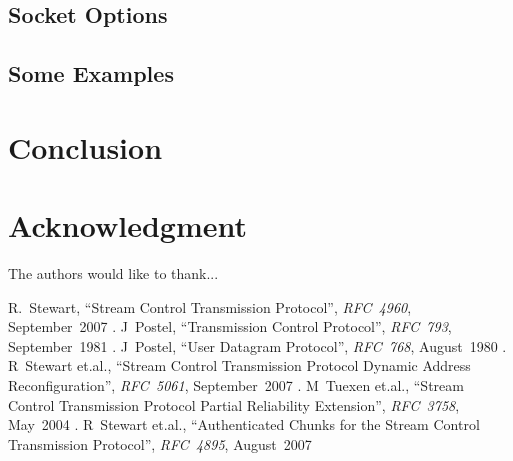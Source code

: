 \documentclass[conference]{IEEEtran}
\begin{document}
\subsection{Socket Options}

\subsection{Some Examples}


\section{Conclusion}

\section*{Acknowledgment}


The authors would like to thank...


\begin{thebibliography}{11}
 R.~Stewart,
  ``Stream Control Transmission Protocol'',
  \textit{RFC~4960},
  September~2007
.  J~Postel,
  ``Transmission Control Protocol'',
  \textit{RFC~793},
  September~1981
.  J~Postel,
  ``User Datagram Protocol'',
  \textit{RFC~768},
  August~1980
.  R~Stewart et.al.,
  ``Stream Control Transmission Protocol Dynamic Address Reconfiguration'',
  \textit{RFC~5061},
  September~2007
.  M~Tuexen et.al.,
 ``Stream Control Transmission Protocol Partial Reliability Extension'',
  \textit{RFC~3758},
  May~2004
.  R~Stewart et.al.,
  ``Authenticated Chunks for the Stream Control Transmission Protocol'',
  \textit{RFC~4895},
  August~2007


\end{thebibliography}




\end{document}
